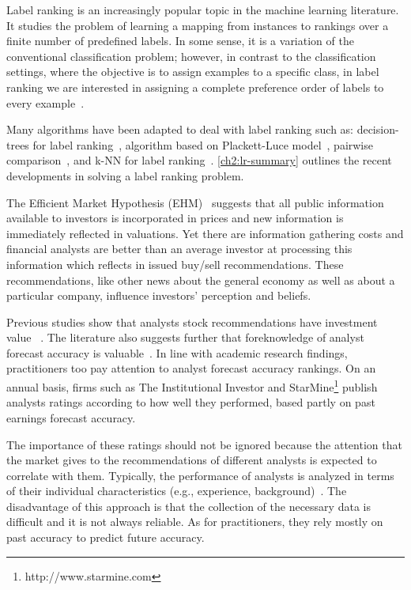 Label ranking is an increasingly popular topic in the machine learning literature. It studies the problem of learning a mapping from instances to rankings over a finite number of predefined labels. In some sense, it is a variation of the conventional classification problem; however, in contrast to the classification settings, where the objective is to assign examples to a specific class, in label ranking we are interested in assigning a complete preference order of labels to every example~\citep{cheng2009}.

Many algorithms have been adapted to deal with label ranking such as: decision-trees for label ranking~\citep{cheng2009}, algorithm based on Plackett-Luce model~\citep{cheng2010}, pairwise comparison~\citep{hullermeier}, and k-NN for label ranking~\citep{brazdil2003}. \ref{ch2:lr-summary} outlines the recent developments in solving a label ranking problem.


The Efficient Market Hypothesis (EHM)~\citep{fama1970ecm} suggests that all public information available to investors is incorporated in prices and new information is immediately reflected in valuations. Yet there are information gathering costs and financial analysts are better than an average investor at processing this information which reflects in issued buy/sell recommendations. These recommendations, like other news about the general economy as well as about a particular company, influence investors' perception and beliefs.

Previous studies show that analysts stock recommendations have investment value ~\citep{womack1996,barber2001}. The literature also suggests further that foreknowledge of analyst forecast accuracy is valuable~\citep{brown2003,aiguzhinov2015a}. In line with academic research findings, practitioners too pay attention to analyst forecast accuracy rankings. On an annual basis, firms such as The Institutional Investor and StarMine\footnote{http://www.starmine.com} publish analysts ratings according to how well they performed, based partly on past earnings forecast accuracy.

The importance of these ratings should not be ignored because the attention that the market gives to the recommendations of different analysts is expected to correlate with them. Typically, the performance of analysts is analyzed in terms of their individual characteristics (e.g., experience, background)~\citep{clement1999}. The disadvantage of this approach is that the collection of the necessary data is difficult and it is not always reliable. As for practitioners, they rely mostly on past accuracy to predict future accuracy.

